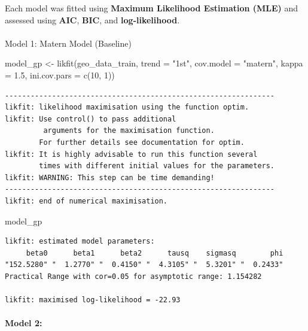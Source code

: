 \documentclass[
  11pt,
]{article}
\makeatletter
\let\oldparagraph\paragraph
\renewcommand{\paragraph}{
    \@ifstar
      \xxxParagraphStar
      \xxxParagraphNoStar
  }
\newcommand{\xxxParagraphStar}[1]{\oldparagraph*{#1}\mbox{}}
\newcommand{\xxxParagraphNoStar}[1]{\oldparagraph{#1}\mbox{}}
\newenvironment{Shaded}{\begin{snugshade}}{\end{snugshade}}
\newcommand{\AttributeTok}[1]{\textcolor[rgb]{0.40,0.45,0.13}{#1}}
\newcommand{\DecValTok}[1]{\textcolor[rgb]{0.68,0.00,0.00}{#1}}
\newcommand{\FloatTok}[1]{\textcolor[rgb]{0.68,0.00,0.00}{#1}}
\newcommand{\FunctionTok}[1]{\textcolor[rgb]{0.28,0.35,0.67}{#1}}
\newcommand{\NormalTok}[1]{\textcolor[rgb]{0.00,0.23,0.31}{#1}}
\newcommand{\OtherTok}[1]{\textcolor[rgb]{0.00,0.23,0.31}{#1}}
\newcommand{\StringTok}[1]{\textcolor[rgb]{0.13,0.47,0.30}{#1}}
\makeatother
\begin{document}
Each model was fitted using \textbf{Maximum Likelihood Estimation (MLE)}
and assessed using \textbf{AIC}, \textbf{BIC}, and
\textbf{log-likelihood}.

\paragraph{Model 1: Matern Model
(Baseline)}\label{model-1-matern-model-baseline}

\begin{Shaded}
\begin{Highlighting}[]
\NormalTok{model\_gp }\OtherTok{\textless{}{-}} \FunctionTok{likfit}\NormalTok{(geo\_data\_train, }\AttributeTok{trend =} \StringTok{"1st"}\NormalTok{, }\AttributeTok{cov.model =} \StringTok{"matern"}\NormalTok{, }\AttributeTok{kappa =} \FloatTok{1.5}\NormalTok{, }\AttributeTok{ini.cov.pars =} \FunctionTok{c}\NormalTok{(}\DecValTok{10}\NormalTok{, }\DecValTok{1}\NormalTok{))}
\end{Highlighting}
\end{Shaded}

\begin{verbatim}
---------------------------------------------------------------
likfit: likelihood maximisation using the function optim.
likfit: Use control() to pass additional
         arguments for the maximisation function.
        For further details see documentation for optim.
likfit: It is highly advisable to run this function several
        times with different initial values for the parameters.
likfit: WARNING: This step can be time demanding!
---------------------------------------------------------------
likfit: end of numerical maximisation.
\end{verbatim}

\begin{Shaded}
\begin{Highlighting}[]
\NormalTok{model\_gp}
\end{Highlighting}
\end{Shaded}

\begin{verbatim}
likfit: estimated model parameters:
     beta0      beta1      beta2      tausq    sigmasq        phi 
"152.5280" "  1.2770" "  0.4150" "  4.3105" "  5.3201" "  0.2433" 
Practical Range with cor=0.05 for asymptotic range: 1.154282

likfit: maximised log-likelihood = -22.93
\end{verbatim}

\paragraph{\texorpdfstring{\textbf{Model 2:}}{Model 2:}}\label{model-2}
\end{document}
